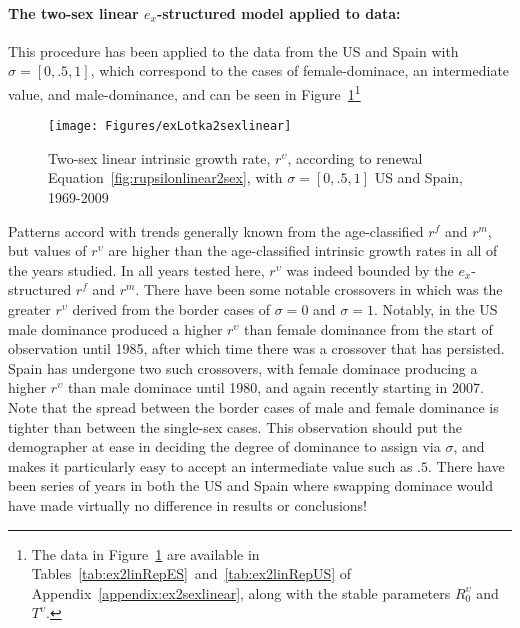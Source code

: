 \paragraph{The two-sex linear $e_x$-structured model applied to data:}

This procedure has been applied to the data from the US and Spain with $\sigma
= [0,.5,1]$, which correspond to the cases of female-dominace, an
intermediate value, and male-dominance, and can be seen in
Figure~\ref{fig:rupsilonlinear2sex}\footnote{The data in
    Figure~\ref{fig:rupsilonlinear2sex} are available in
    Tables~\ref{tab:ex2linRepES}~and~\ref{tab:ex2linRepUS} of
    Appendix~\ref{appendix:ex2sexlinear}, along with the stable parameters
    $R_0^\upsilon$ and $T^\upsilon$.}

\begin{figure}[!ht]
  \centering
    \caption{Two-sex linear intrinsic growth rate, $r^\upsilon$, according to
    renewal Equation~\eqref{fig:rupsilonlinear2sex}, with $\sigma = [0, .5, 1]$ US 
    and Spain, 1969-2009}
     \texttt{[image: Figures/exLotka2sexlinear]}
     \label{fig:rupsilonlinear2sex}
\end{figure}

Patterns accord with trends generally known from the age-classified $r^f$ and
$r^m$, but values of $r^\upsilon$ are higher than the
age-classified intrinsic growth rates in all of the years studied. In all years
tested here, $r^\upsilon$ was indeed bounded by the $e_x$-structured $r^f$ and $r^m$. There have been some notable crossovers in
which was the greater $r^\upsilon$ derived from the border cases of $\sigma = 0$
and  $\sigma = 1$. Notably, in the US male dominance produced a higher
$r^\upsilon$ than female dominance from the start of observation until
1985, after which time there was a crossover that has persisted. Spain has
undergone two such crossovers, with female dominace producing a higher
$r^\upsilon$ than male dominace until 1980, and again recently starting in 2007.
Note that the spread between the border cases of male and female dominance is
tighter than between the single-sex cases. This observation should put the
demographer at ease in deciding the degree of dominance to assign via $\sigma$,
and makes it particularly easy to accept an intermediate value such as $.5$.
There have been series of years in both the US and Spain where swapping dominace
would have made virtually no difference in results or conclusions!

